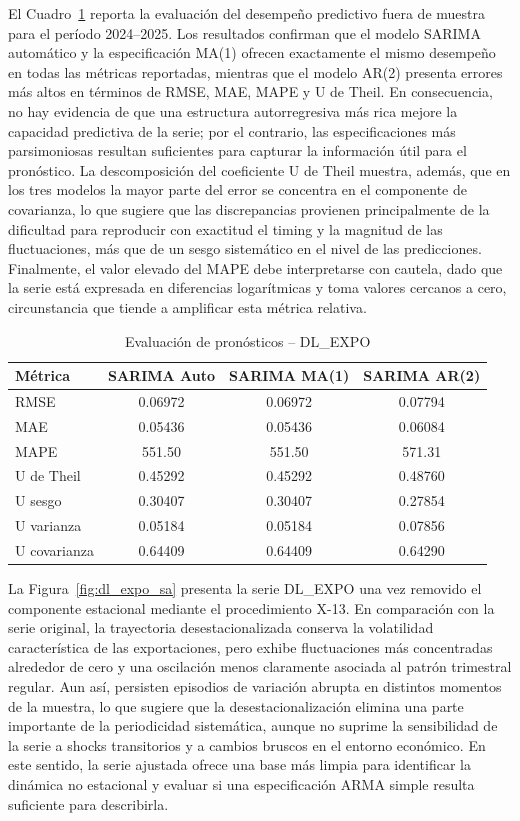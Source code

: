 \documentclass[11pt]{article}
\begin{document}
El Cuadro~\ref{tab:forecast_expo_sarima} reporta la evaluación del desempeño predictivo fuera de muestra para el período 2024--2025. Los resultados confirman que el modelo SARIMA automático y la especificación MA(1) ofrecen exactamente el mismo desempeño en todas las métricas reportadas, mientras que el modelo AR(2) presenta errores más altos en términos de RMSE, MAE, MAPE y U de Theil. En consecuencia, no hay evidencia de que una estructura autorregresiva más rica mejore la capacidad predictiva de la serie; por el contrario, las especificaciones más parsimoniosas resultan suficientes para capturar la información útil para el pronóstico. La descomposición del coeficiente U de Theil muestra, además, que en los tres modelos la mayor parte del error se concentra en el componente de covarianza, lo que sugiere que las discrepancias provienen principalmente de la dificultad para reproducir con exactitud el timing y la magnitud de las fluctuaciones, más que de un sesgo sistemático en el nivel de las predicciones. Finalmente, el valor elevado del MAPE debe interpretarse con cautela, dado que la serie está expresada en diferencias logarítmicas y toma valores cercanos a cero, circunstancia que tiende a amplificar esta métrica relativa.

\begin{table}[H]
\centering
\caption{Evaluación de pronósticos – DL\_EXPO}
\label{tab:forecast_expo_sarima}
\begin{tabular}{lccc}
\hline
Métrica & SARIMA Auto & SARIMA MA(1) & SARIMA AR(2) \\
\hline
RMSE         & 0.06972 & 0.06972 & 0.07794 \\
MAE          & 0.05436 & 0.05436 & 0.06084 \\
MAPE         & 551.50  & 551.50  & 571.31 \\
U de Theil   & 0.45292 & 0.45292 & 0.48760 \\
U sesgo      & 0.30407 & 0.30407 & 0.27854 \\
U varianza   & 0.05184 & 0.05184 & 0.07856 \\
U covarianza & 0.64409 & 0.64409 & 0.64290 \\
\hline
\end{tabular}
\end{table}

La Figura~\ref{fig:dl_expo_sa} presenta la serie DL\_EXPO una vez removido el componente estacional mediante el procedimiento X-13. En comparación con la serie original, la trayectoria desestacionalizada conserva la volatilidad característica de las exportaciones, pero exhibe fluctuaciones más concentradas alrededor de cero y una oscilación menos claramente asociada al patrón trimestral regular. Aun así, persisten episodios de variación abrupta en distintos momentos de la muestra, lo que sugiere que la desestacionalización elimina una parte importante de la periodicidad sistemática, aunque no suprime la sensibilidad de la serie a shocks transitorios y a cambios bruscos en el entorno económico. En este sentido, la serie ajustada ofrece una base más limpia para identificar la dinámica no estacional y evaluar si una especificación ARMA simple resulta suficiente para describirla.
\end{document}
